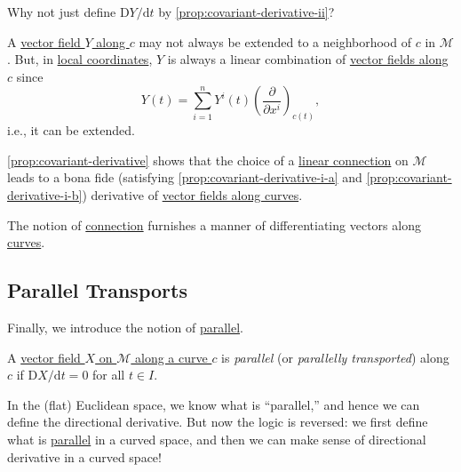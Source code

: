 \begin{problem}
Why not just define \(\mathrm{D} Y / \mathrm{d} t\) by \autoref{prop:covariant-derivative-ii}?
\end{problem}
\begin{answer}
	A \hyperref[def:vector-field-along-curve]{vector field \(Y\) along \(c\)} may not always be extended to a neighborhood of \(c\) in \(\mathcal{M} \). But, in \hyperref[def:coordinate-chart]{local coordinates}, \(Y\) is always a linear combination of \hyperref[def:vector-field-along-curve]{vector fields along \(c\)} since
	\[
		Y(t) = \sum_{i=1}^{n} Y^i (t) \left( \frac{\partial }{\partial x^i} \right) _{c(t)},
	\]
	i.e., it can be extended.
\end{answer}
\autoref{prop:covariant-derivative} shows that the choice of a \hyperref[def:linear-connection]{linear connection} on \(\mathcal{M} \) leads to a bona fide (satisfying \autoref{prop:covariant-derivative-i-a} and \autoref{prop:covariant-derivative-i-b}) derivative of \hyperref[def:vector-field-along-curve]{vector fields along curves}.

\begin{remark}
	The notion of \hyperref[def:linear-connection]{connection} furnishes a manner of differentiating vectors along \hyperref[def:curve]{curves}.
\end{remark}

\subsection{Parallel Transports}
Finally, we introduce the notion of \hyperref[def:parallel]{parallel}.

\begin{definition}[Parallel]\label{def:parallel}
	A \hyperref[def:vector-field-along-curve]{vector field \(X\) on \(\mathcal{M} \) along a curve \(c\)} is \emph{parallel} (or \emph{parallelly transported}) along \(c\) if \(\mathrm{D} X/ \mathrm{d} t = 0\) for all \(t\in I\).
\end{definition}

\begin{intuition}
	In the (flat) Euclidean space, we know what is ``parallel,'' and hence we can define the directional derivative. But now the logic is reversed: we first define what is \hyperref[def:parallel]{parallel} in a curved space, and then we can make sense of directional derivative in a curved space!
	\begin{center}
	\end{center}
\end{intuition}

